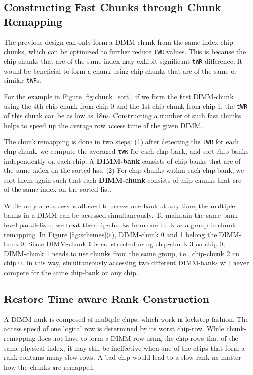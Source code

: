 \subsection{Constructing Fast Chunks through Chunk Remapping}

The previous design can only form a DIMM-chunk from the same-index chip-chunks, which can be optimized to further reduce {\tt tWR} values. This is because the chip-chunks that are of the same index may exhibit significant {\tt tWR} difference. It would be beneficial to form a chunk using chip-chunks that are of the same or similar {\tt tWR}s. 

For the example in Figure \ref{fig:chunk_sort}, if we form the first DIMM-chunk using the 4th chip-chunk from chip 0 and the 1st chip-chunk from chip 1, the {\tt tWR} of this chunk can be as low as 18ns. Constructing a number of such fast chunks helps to speed up the average row access time of the given DIMM.

The chunk remapping is done in two steps: (1) after detecting the {\tt tWR} for each chip-chunk, we compute the averaged {\tt tWR} for each chip-bank, and sort chip-banks independently on each chip. A {\bf DIMM-bank} consists of chip-banks that are of the same index on the sorted list; (2) For chip-chunks within each chip-bank, we sort them again such that each {\bf DIMM-chunk} consists of chip-chunks that are of the same index on the sorted list. 

While only one access is allowed to access one bank at any time, the multiple banks in a DIMM can be accessed simultaneously. To maintain the same bank level parallelism, we treat the chip-chunks from one bank as a group in chunk remapping. In Figure \ref{fig:schemes}(c), 
DIMM-chunk 0 and 1 belong the DIMM-bank 0. Since DIMM-chunk 0 is constructed using chip-chunk 3 on chip 0, DIMM-chunk 1 needs to use chunks from the same group, i.e., chip-chunk 2 on chip 0. In this way, simultaneously accessing two different DIMM-banks will never compete for the same chip-bank on any chip. 

\subsection{Restore Time aware Rank Construction}
\label{sec:match_twr}

A DIMM rank is composed of multiple chips, which work in lockstep fashion. The access speed of one logical row is determined by its worst chip-row. While chunk-remapping does not have to form a DIMM-row using the chip rows that of the same physical index, it may still be ineffective when one of the chips that form a rank contains many slow rows. A bad chip would lead to a slow rank no matter how the chunks are remapped.

